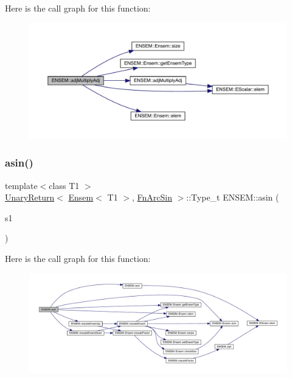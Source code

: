 Here is the call graph for this function\+:\nopagebreak
\begin{figure}[H]
\begin{center}
\leavevmode
\includegraphics[width=350pt]{d1/d9e/group__eensem_ga58683063315813c7adaca604c28f954f_cgraph}
\end{center}
\end{figure}
\mbox{\label{group__eensem_gada63412fd27e80930e9d85703ba2394b}} 
\subsubsection{\texorpdfstring{asin()}{asin()}}
{\footnotesize\ttfamily template$<$class T1 $>$ \\
\mbox{\hyperlink{structENSEM_1_1UnaryReturn}{Unary\+Return}}$<$ \mbox{\hyperlink{classENSEM_1_1Ensem}{Ensem}}$<$ T1 $>$, \mbox{\hyperlink{structENSEM_1_1FnArcSin}{Fn\+Arc\+Sin}} $>$\+::Type\+\_\+t E\+N\+S\+E\+M\+::asin (\begin{DoxyParamCaption}\item[{const \mbox{\hyperlink{classENSEM_1_1Ensem}{Ensem}}$<$ T1 $>$ \&}]{s1 }\end{DoxyParamCaption})\hspace{0.3cm}{\ttfamily [inline]}}

Here is the call graph for this function\+:\nopagebreak
\begin{figure}[H]
\begin{center}
\leavevmode
\includegraphics[width=350pt]{d1/d9e/group__eensem_gada63412fd27e80930e9d85703ba2394b_cgraph}
\end{center}
\end{figure}
\mbox{\label{group__eensem_gaa9d40be37b4214b6c8f1e94f6a52dea3}} 
